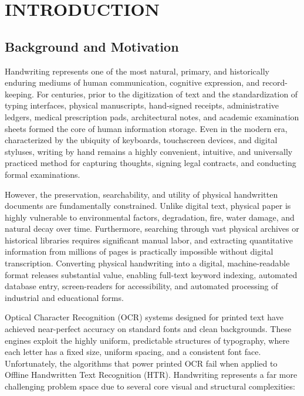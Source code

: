 
\chapter{INTRODUCTION}
\label{ch:introduction}

\section{Background and Motivation}
Handwriting represents one of the most natural, primary, and historically enduring mediums of human communication, cognitive expression, and record-keeping. For centuries, prior to the digitization of text and the standardization of typing interfaces, physical manuscripts, hand-signed receipts, administrative ledgers, medical prescription pads, architectural notes, and academic examination sheets formed the core of human information storage. Even in the modern era, characterized by the ubiquity of keyboards, touchscreen devices, and digital styluses, writing by hand remains a highly convenient, intuitive, and universally practiced method for capturing thoughts, signing legal contracts, and conducting formal examinations.

However, the preservation, searchability, and utility of physical handwritten documents are fundamentally constrained. Unlike digital text, physical paper is highly vulnerable to environmental factors, degradation, fire, water damage, and natural decay over time. Furthermore, searching through vast physical archives or historical libraries requires significant manual labor, and extracting quantitative information from millions of pages is practically impossible without digital transcription. Converting physical handwriting into a digital, machine-readable format releases substantial value, enabling full-text keyword indexing, automated database entry, screen-readers for accessibility, and automated processing of industrial and educational forms.

Optical Character Recognition (OCR) systems designed for printed text have achieved near-perfect accuracy on standard fonts and clean backgrounds. These engines exploit the highly uniform, predictable structures of typography, where each letter has a fixed size, uniform spacing, and a consistent font face. Unfortunately, the algorithms that power printed OCR fail when applied to Offline Handwritten Text Recognition (HTR). Handwriting represents a far more challenging problem space due to several core visual and structural complexities:

